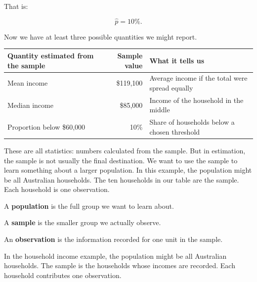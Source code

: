 \documentclass[
  letterpaper,
  DIV=11,
  numbers=noendperiod]{scrreprt}
\begin{document}
That is:

\[
\hat{p} = 10\%.
\]

Now we have at least three possible quantities we might report.

\begin{table}
\fontsize{12.0pt}{14.0pt}\selectfont
\begin{tabular*}{\linewidth}{@{\extracolsep{\fill}}lrl}
\toprule
Quantity estimated from the sample & Sample value & What it tells us \\ 
\midrule\addlinespace[2.5pt]
Mean income & \$119,100 & Average income if the total were spread equally \\ 
Median income & \$85,000 & Income of the household in the middle \\ 
Proportion below \$60,000 & 10\% & Share of households below a chosen threshold \\ 
\bottomrule
\end{tabular*}
\end{table}

These are all statistics: numbers calculated from the sample. But in
estimation, the sample is not usually the final destination. We want to
use the sample to learn something about a larger population. In this
example, the population might be all Australian households. The ten
households in our table are the sample. Each household is one
observation.

\begin{tcolorbox}[enhanced jigsaw, arc=.35mm, bottomrule=.15mm, bottomtitle=1mm, breakable, colback=white, colbacktitle=quarto-callout-note-color!10!white, colframe=quarto-callout-note-color-frame, coltitle=black, left=2mm, leftrule=.75mm, opacityback=0, opacitybacktitle=0.6, rightrule=.15mm, title=\textcolor{quarto-callout-note-color}{\faInfo}\hspace{0.5em}{Terminology: population, sample, and observation}, titlerule=0mm, toprule=.15mm, toptitle=1mm]

A \textbf{population} is the full group we want to learn about.

A \textbf{sample} is the smaller group we actually observe.

An \textbf{observation} is the information recorded for one unit in the
sample.

In the household income example, the population might be all Australian
households. The sample is the households whose incomes are recorded.
Each household contributes one observation.

\end{tcolorbox}
\end{document}

